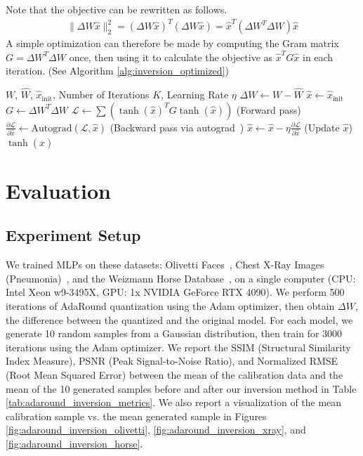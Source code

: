 \documentclass[../main.tex]{subfiles}
\begin{document}
Note that the objective can be rewritten as follows.
\begin{align}
\|\Delta W \hat{x}\|_2^2 = (\Delta W \hat{x})^T(\Delta W \hat{x}) = \hat{x}^T (\Delta W^T \Delta W) \hat{x}
\end{align}
A simple optimization can therefore be made by computing the Gram matrix $G = \Delta W^T \Delta W$ once, then using it to calculate the objective as $\hat{x}^TG\hat{x}$ in each iteration. (See Algorithm \ref{alg:inversion_optimized})

\begin{algorithm}[H]
\caption{Proposed Inversion with Optimization}\label{alg:inversion_optimized}
\begin{algorithmic}[1]
\Require $W$, $\hat{W}$, $\hat{x}_{\text{init}}$, Number of Iterations $K$, Learning Rate $\eta$
\State $\Delta W \gets W - \hat{W}$
\State $\hat{x} \gets \hat{x}_\text{init}$
\State $G \gets \Delta W^T \Delta W$
    \State $\mathcal{L}  \gets \sum \left( \tanh(\hat{x})^TG  \tanh(\hat{x}) \right)$ (Forward pass)
    \State $\frac{\partial \mathcal{L}}{\partial \hat{x}} \gets \text{Autograd}(\mathcal{L}, \hat{x})$ (Backward pass via autograd~\cite{paszkePyTorchImperativeStyle2019})
    \State $\hat{x} \gets \hat{x} - \eta \frac{\partial\mathcal{L}}{\partial{\hat{x}}}$ (Update $\hat{x}$)
\EndFor
\State \Return $\tanh(\hat{x})$
\end{algorithmic}
\end{algorithm}

\section{Evaluation} \label{sec:adaround_inversion_experiment_setup}
\subsection{Experiment Setup}
We trained MLPs on these datasets: Olivetti Faces~\cite{JMLR:v12:pedregosa11a}, Chest X-Ray Images (Pneumonia)~\cite{kermanyIdentifyingMedicalDiagnoses2018}, and the Weizmann Horse Database~\cite{weizmannHorseDB}, on a single computer (CPU: Intel Xeon w9-3495X, GPU: 1x NVIDIA GeForce RTX 4090). We perform 500 iterations of AdaRound quantization using the Adam optimizer, then obtain $\Delta W$, the difference between the quantized and the original model. For each model, we generate 10 random samples from a Gaussian distribution, then train for 3000 iterations using the Adam optimizer. We report the SSIM (Structural Similarity Index Measure), PSNR (Peak Signal-to-Noise Ratio), and Normalized RMSE (Root Mean Squared Error) between the mean of the calibration data and the mean of the 10 generated samples before and after our inversion method in Table \ref{tab:adaround_inversion_metrics}. We also report a visualization of the mean calibration sample vs. the mean generated sample in Figures \ref{fig:adaround_inversion_olivetti}, \ref{fig:adaround_inversion_xray}, and \ref{fig:adaround_inversion_horse}.
\end{document}
